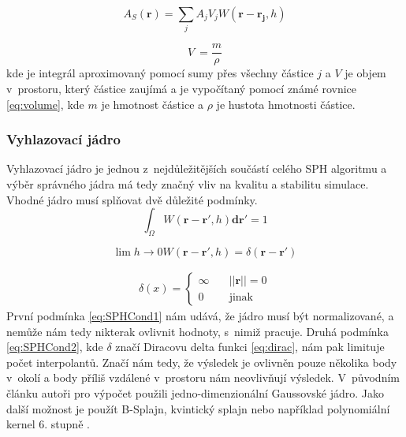 \begin{equation}
    A_S(\mathbf{r}) = \sum_j A_j V_j W(\mathbf{r} - \mathbf{r_j},h)
    \label{eq:SPHsum}
\end{equation}

\begin{equation}
    V~= \frac{m}{\rho}
    \label{eq:volume}
\end{equation}
 kde je integrál aproximovaný pomocí sumy přes všechny částice $j$ a $V$ je objem v~prostoru, který částice zaujímá a je vypočítaný pomocí známé rovnice \ref{eq:volume}, kde $m$ je hmotnost částice a $\rho$ je hustota hmotnosti částice.  \cite{KelagerSPH}
 
 \subsubsection{Vyhlazovací jádro}
 Vyhlazovací jádro je jednou z~nejdůležitějších součástí celého SPH algoritmu a výběr správného jádra má tedy značný vliv na kvalitu a stabilitu simulace. Vhodné jádro musí splňovat dvě důležité podmínky.
 \begin{equation}
     \int_\Omega W(\mathbf{r} - \mathbf{r}', h)\mathbf{dr}' = 1
     \label{eq:SPHCond1}
 \end{equation}
 
 \begin{equation}
     \lim{h \to 0} W(\mathbf{r} - \mathbf{r}',h) = \delta(\mathbf{r} - \mathbf{r}')
     \label{eq:SPHCond2}
 \end{equation}
 
 \begin{equation} \label{eq:dirac}
\begin{gathered}
\delta(x) =
  \begin{cases}
    \infty  & \quad ||\mathbf{r}|| = 0\\
    0       & \quad \text{jinak} 
  \end{cases}
\end{gathered}
\end{equation}
 První podmínka \ref{eq:SPHCond1} nám udává, že jádro musí být normalizované, a nemůže nám tedy nikterak ovlivnit hodnoty, s~nimiž pracuje. Druhá podmínka \ref{eq:SPHCond2}, kde $\delta$ značí Diracovu delta funkci \ref{eq:dirac}, nám pak limituje počet interpolantů. Značí nám tedy, že výsledek je ovlivněn pouze několika body v~okolí a body příliš vzdálené v~prostoru nám neovlivňují výsledek. V~původním článku autoři pro výpočet použili jedno-dimenzionální Gaussovské jádro. Jako další možnost je použít B-Splajn, kvintický splajn \cite{Liu2010} nebo například polynomiální kernel 6. stupně \cite{Muller03}.
 
